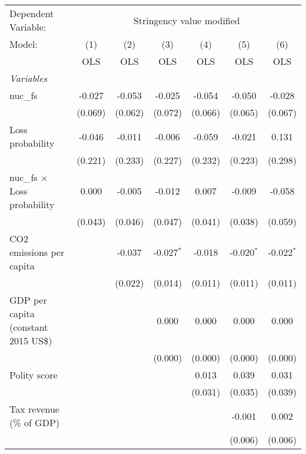 
\begingroup
\centering
\begin{tabular}{lcccccc}
   \toprule
   Dependent Variable: & \multicolumn{6}{c}{Stringency value modified}\\
   Model:                               & (1)     & (2)     & (3)          & (4)     & (5)          & (6)\\  
                                        &  OLS    & OLS     & OLS          & OLS     & OLS          & OLS\\  
   \midrule
   \emph{Variables}\\
   nuc\_fs                              & -0.027  & -0.053  & -0.025       & -0.054  & -0.050       & -0.028\\   
                                        & (0.069) & (0.062) & (0.072)      & (0.066) & (0.065)      & (0.067)\\   
   Loss probability                     & -0.046  & -0.011  & -0.006       & -0.059  & -0.021       & 0.131\\   
                                        & (0.221) & (0.233) & (0.227)      & (0.232) & (0.223)      & (0.298)\\   
   nuc\_fs $\times$ Loss probability    & 0.000   & -0.005  & -0.012       & 0.007   & -0.009       & -0.058\\   
                                        & (0.043) & (0.046) & (0.047)      & (0.041) & (0.038)      & (0.059)\\   
   CO2 emissions per capita             &         & -0.037  & -0.027$^{*}$ & -0.018  & -0.020$^{*}$ & -0.022$^{*}$\\   
                                        &         & (0.022) & (0.014)      & (0.011) & (0.011)      & (0.011)\\   
   GDP per capita (constant 2015 US\$)  &         &         & 0.000        & 0.000   & 0.000        & 0.000\\   
                                        &         &         & (0.000)      & (0.000) & (0.000)      & (0.000)\\   
   Polity score                         &         &         &              & 0.013   & 0.039        & 0.031\\   
                                        &         &         &              & (0.031) & (0.035)      & (0.039)\\   
   Tax revenue (\% of GDP)              &         &         &              &         & -0.001       & 0.002\\   
                                        &         &         &              &         & (0.006)      & (0.006)\\   

\end{tabular}
